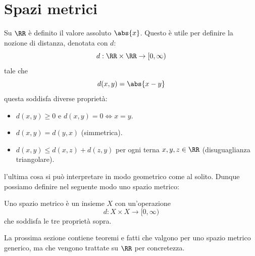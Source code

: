 \documentclass[11pt]{scrartcl}
\begin{document}
	\section{Spazi metrici}
	Su $\RR$ è definito il valore assoluto $\abs{x}$. Questo è utile per definire la nozione di distanza, denotata con $d$:
	$$d:\RR\times\RR\to[0,\infty)$$
	tale che 
	$$d(x,y)=\abs{x-y}$$
	questa soddisfa diverse proprietà:
	\begin{itemize}
		\item $d(x,y)\ge 0$ e $d(x,y)=0\iff x=y$.
		\item $d(x,y)=d(y,x)$ (simmetrica).
		\item $d(x,y)\le d(x,z)+d(z,y)$ per ogni terna $x,y,z\in\RR$ (disuguaglianza triangolare).
	\end{itemize}
	l'ultima cosa si può interpretare in modo geometrico come al solito. Dunque possiamo definire nel seguente modo uno spazio metrico:
	\begin{definition}
		Uno spazio metrico è un insieme $X$ con un'operazione 
		$$d:X\times X\to [0,\infty)$$
		che soddisfa le tre proprietà sopra.
	\end{definition}
	La prossima sezione contiene teoremi e fatti che valgono per uno spazio metrico generico, ma che vengono trattate su $\RR$ per concretezza.
	
\end{document}
